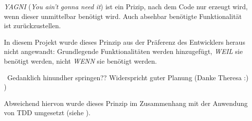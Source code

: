 


\textit{YAGNI} (\textit{You ain't gonna need it}) ist ein Prizip, nach dem Code nur erzeugt wird, wenn dieser unmittelbar benötigt wird. Auch absehbar benötigte Funktionalität ist zurückzustellen.

In diesem Projekt wurde dieses Prinzip aus der Präferenz des Entwicklers heraus nicht angewandt: Grundlegende Funktionalitäten werden hinzugefügt, \textit{WEIL} sie benötigt werden, nicht \textit{WENN} sie benötigt werden.


\missing\
Gedanklich hinundher springen??
Widerspricht guter Planung (Danke Theresa :) )


Abweichend hiervon wurde dieses Prinzip im Zusammenhang mit der Anwendung von TDD umgesetzt (siehe ).


